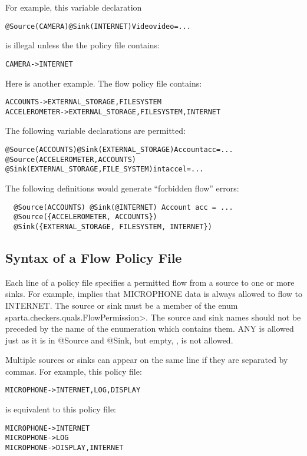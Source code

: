 For example, this variable declaration

\begin{alltt}
@Source(CAMERA) @Sink(INTERNET) Video video = ...
\end{alltt}

\noindent
is illegal unless the the policy file contains:

\begin{alltt}
CAMERA -> INTERNET
\end{alltt}

Here is another example.
The flow policy file contains:
\begin{alltt}
  ACCOUNTS      -> EXTERNAL_STORAGE, FILESYSTEM
  ACCELEROMETER -> EXTERNAL_STORAGE, FILESYSTEM, INTERNET
\end{alltt}

The following variable declarations are permitted:
\begin{alltt}
  @Source(ACCOUNTS) @Sink(EXTERNAL_STORAGE) Account acc = ...
  @Source({ACCELEROMETER, ACCOUNTS})
  @Sink({EXTERNAL_STORAGE, FILE_SYSTEM}) int accel = ...
\end{alltt}

The following definitions would generate ``forbidden flow'' errors:
\begin{Verbatim}
  @Source(ACCOUNTS) @Sink(@INTERNET) Account acc = ...
  @Source({ACCELEROMETER, ACCOUNTS})
  @Sink({EXTERNAL_STORAGE, FILESYSTEM, INTERNET})
\end{Verbatim}


\subsection{Syntax of a Flow Policy File}

Each line of a policy file specifies a permitted flow from a source to one
or more sinks.  For example,
 implies that
MICROPHONE data is always allowed to flow to INTERNET.
The source or sink must be a member of the enum
\<sparta.checkers.quals.FlowPermission>.  The source 
and sink names should not be preceded by the name of the enumeration which contains them.
ANY is allowed just as it is in @Source and @Sink, but empty, \ttcbs, is not allowed.

Multiple sources or sinks can appear on the same line if they are separated by commas. 
For example,
this policy file:
\begin{alltt}
   MICROPHONE -> INTERNET, LOG, DISPLAY
\end{alltt}
is equivalent to this policy file:
\begin{alltt}
   MICROPHONE -> INTERNET
   MICROPHONE -> LOG
   MICROPHONE -> DISPLAY, INTERNET
\end{alltt}

